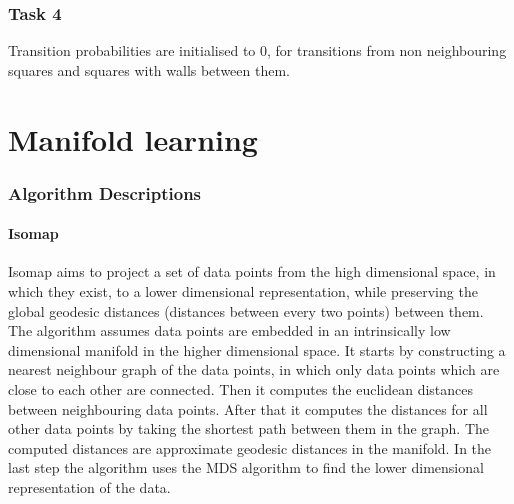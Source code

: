 \documentclass[a4paper, 11pt]{article}
\begin{document}
\section{Task 4}
Transition probabilities are initialised to 0, for transitions from non neighbouring squares and squares with walls between them.


\pagebreak
\part*{Manifold learning}
\section*{Algorithm Descriptions}

\subsection{Isomap}
Isomap \cite{Tenenbaum2000} aims to project a set of data points from the high dimensional space, in which they exist, to a lower dimensional representation, while preserving the global geodesic distances (distances between every two points) between them. The algorithm assumes data points are embedded in an intrinsically low dimensional manifold in the higher dimensional space. It starts by constructing a nearest neighbour graph of the data points, in which only data points which are close to each other are connected. Then it computes the euclidean distances between neighbouring data points. After that it computes the distances for all other data points by taking the shortest path between them in the graph. The computed distances are approximate geodesic distances in the manifold. In the last step the algorithm uses the MDS algorithm to find the lower dimensional representation of the data.

%
\end{document}
